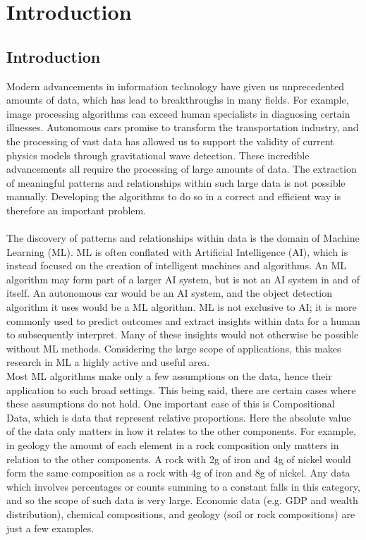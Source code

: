 \chapter{Introduction}
\label{cha:intro}
\section{Introduction}
Modern advancements in information technology have given us unprecedented amounts of data, which has lead to breakthroughs in many fields. For example, image processing algorithms can exceed human specialists in diagnosing certain illnesses. Autonomous cars promise to transform the transportation industry, and the processing of vast data has allowed us to support the validity of current physics models through gravitational wave detection. These incredible advancements all require the processing of large amounts of data. The extraction of meaningful patterns and relationships within such large data is not possible manually. Developing the algorithms to do so in a correct and efficient way is therefore an important problem. \\\\  
The discovery of patterns and relationships within data is the domain of Machine Learning (ML). ML is often conflated with Artificial Intelligence (AI), which is instead focused on the creation of intelligent machines and algorithms. An ML algorithm may form part of a larger AI system, but is not an AI system in and of itself. An autonomous car would be an AI system, and the object detection algorithm it uses would be a ML algorithm. ML is not exclusive to AI; it is more commonly used to predict outcomes and extract insights within data for a human to subsequently interpret. Many of these insights would not otherwise be possible without ML methods. Considering the large scope of applications, this makes research in ML a highly active and useful area.  \\

Most ML algorithms make only a few assumptions on the data, hence their application to such broad settings. This being said, there are certain cases where these assumptions do not hold. One important case of this is Compositional Data, which is data that represent relative proportions. Here the absolute value of the data only matters in how it relates to the other components. For example, in geology the amount of each element in a rock composition only matters in relation to the other components. A rock with 2g of iron and 4g of nickel would form the same composition as a rock with 4g of iron and 8g of nickel. Any data which involves percentages or counts summing to a constant falls in this category, and so the scope of such data is very large. Economic data (e.g. GDP and wealth distribution), chemical compositions, and geology (soil or rock compositions) are just a few examples.


